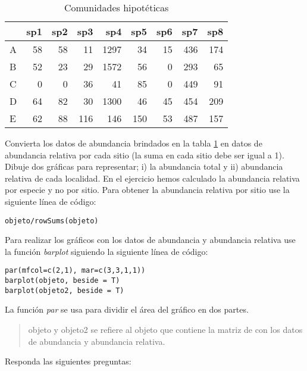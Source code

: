 \documentclass[
]{article}
\begin{document}
\begin{table}

\caption{\label{tab:ejer1}Comunidades hipotéticas}
\centering
\begin{tabular}[t]{lrrrrrrrr}
\toprule
  & sp1 & sp2 & sp3 & sp4 & sp5 & sp6 & sp7 & sp8\\
\midrule
A & 58 & 58 & 11 & 1297 & 34 & 15 & 436 & 174\\
B & 52 & 23 & 29 & 1572 & 56 & 0 & 293 & 65\\
C & 0 & 0 & 36 & 41 & 85 & 0 & 449 & 91\\
D & 64 & 82 & 30 & 1300 & 46 & 45 & 454 & 209\\
E & 62 & 88 & 116 & 146 & 150 & 53 & 487 & 157\\
\bottomrule
\end{tabular}
\end{table}

Convierta los datos de abundancia brindados en la tabla \ref{tab:ejer1} en datos de abundancia relativa por cada sitio (la suma en cada sitio debe ser igual a 1). Dibuje dos gráficas para representar; i) la abundancia total y ii) abundancia relativa de cada localidad. En el ejercicio hemos calculado la abundancia relativa por especie y no por sitio. Para obtener la abundancia relativa por sitio use la siguiente línea de código:

\begin{verbatim}
objeto/rowSums(objeto)
\end{verbatim}

Para realizar los gráficos con los datos de abundancia y abundancia relativa use la función \emph{barplot} siguiendo la siguiente línea de código:

\begin{verbatim}
par(mfcol=c(2,1), mar=c(3,3,1,1))
barplot(objeto, beside = T)
barplot(objeto2, beside = T)
\end{verbatim}

La función \emph{par} se usa para dividir el área del gráfico en dos partes.

\begin{quote}
objeto y objeto2 se refiere al objeto que contiene la matriz de con los datos de abundancia y abundancia relativa.
\end{quote}

Responda las siguientes preguntas:
\end{document}
